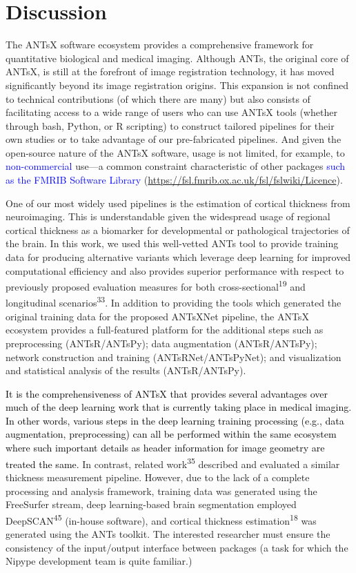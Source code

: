 \documentclass[12pt,]{article}
\begin{document}
\hypertarget{discussion}{%
\section*{Discussion}\label{discussion}}

The ANTsX software ecosystem provides a comprehensive framework for
quantitative biological and medical imaging. Although ANTs, the original
core of ANTsX, is still at the forefront of image registration
technology, it has moved significantly beyond its image registration
origins. This expansion is not confined to technical contributions (of
which there are many) but also consists of facilitating access to a wide
range of users who can use ANTsX tools (whether through bash, Python, or
R scripting) to construct tailored pipelines for their own studies or to
take advantage of our pre-fabricated pipelines. And given the
open-source nature of the ANTsX software, usage is not limited, for
example, to \textcolor{blue}{non-commercial} use---a common constraint
characteristic of other packages
\textcolor{blue}{such as the FMRIB Software Library}
(\url{https://fsl.fmrib.ox.ac.uk/fsl/fslwiki/Licence}).

One of our most widely used pipelines is the estimation of cortical
thickness from neuroimaging. This is understandable given the widespread
usage of regional cortical thickness as a biomarker for developmental or
pathological trajectories of the brain. In this work, we used this
well-vetted ANTs tool to provide training data for producing alternative
variants which leverage deep learning for improved computational
efficiency and also provides superior performance with respect to
previously proposed evaluation measures for both
cross-sectional\textsuperscript{19} and longitudinal
scenarios\textsuperscript{33}. In addition to providing the tools which
generated the original training data for the proposed ANTsXNet pipeline,
the ANTsX ecosystem provides a full-featured platform for the additional
steps such as preprocessing (ANTsR/ANTsPy); data augmentation
(ANTsR/ANTsPy); network construction and training (ANTsRNet/ANTsPyNet);
and visualization and statistical analysis of the results
(ANTsR/ANTsPy).

\textcolor{black}{It is the comprehensiveness of ANTsX that provides several
advantages over much of the deep learning work that is currently taking place in
medical imaging. In other words, various steps in the deep learning training
processing (e.g., data augmentation, preprocessing) can all be performed within
the same ecosystem where such important details as header information for image
geometry are treated the same.} In contrast, related
work\textsuperscript{35} described and evaluated a similar thickness
measurement pipeline. However, due to the lack of a complete processing
and analysis framework, training data was generated using the FreeSurfer
stream, deep learning-based brain segmentation employed
DeepSCAN\textsuperscript{45} (in-house software), and cortical thickness
estimation\textsuperscript{18} was generated using the ANTs toolkit. The
interested researcher must ensure the consistency of the input/output
interface between packages (a task for which the Nipype development team
is quite familiar.)
\end{document}
